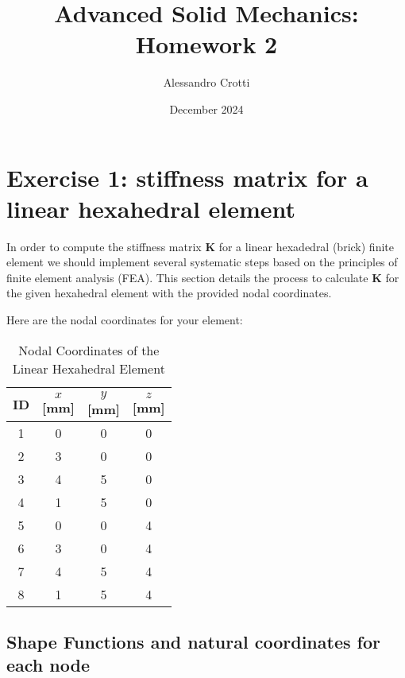 \documentclass{article}
\title{Advanced Solid Mechanics: Homework 2}
\author{Alessandro Crotti}
\date{December 2024}
\begin{document}
\maketitle


\section{Exercise 1: stiffness matrix for a linear hexahedral element}
In order to compute the stiffness matrix $\mathbf{K}$ for a linear hexadedral (brick) finite element we should implement several systematic steps based on the principles of finite element analysis (FEA). 
This section details the process to calculate $\mathbf{K}$ for the given hexahedral element with the provided nodal coordinates.



Here are the nodal coordinates for your element:

\begin{table}[h!]
    \centering
    \begin{tabular}{cccc}
        \toprule
        ID & $$ x $$ [mm] & $$ y $$ [mm] & $$ z $$ [mm] \\
        \midrule
        1 & 0 & 0 & 0 \\
        2 & 3 & 0 & 0 \\
        3 & 4 & 5 & 0 \\
        4 & 1 & 5 & 0 \\
        5 & 0 & 0 & 4 \\
        6 & 3 & 0 & 4 \\
        7 & 4 & 5 & 4 \\
        8 & 1 & 5 & 4 \\
        \bottomrule
    \end{tabular}
    \caption{Nodal Coordinates of the Linear Hexahedral Element}
    \label{tab:nodal_coordinates}
\end{table}

\subsection{Shape Functions and natural coordinates for each node}
\end{document}
